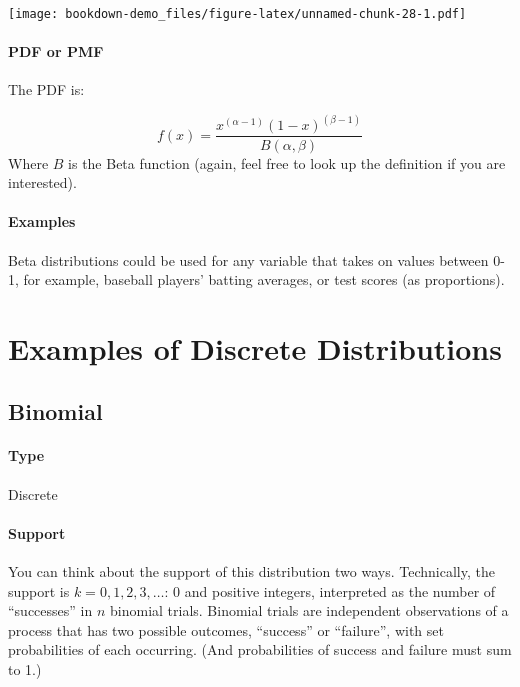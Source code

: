 \documentclass[]{book}
\let\oldparagraph\paragraph
\renewcommand{\paragraph}[1]{\oldparagraph{#1}\mbox{}}
\begin{document}
\texttt{[image: bookdown-demo\_files/figure-latex/unnamed-chunk-28-1.pdf]}

\hypertarget{pdf-or-pmf-2}{%
\paragraph{PDF or PMF}\label{pdf-or-pmf-2}}

The PDF is:

\[ f(x) = \frac{x^{(\alpha -1)}(1-x)^{(\beta-1)}}{ B(\alpha, \beta)}\]
Where \(B\) is the Beta function (again, feel free to look up the definition if you are interested).

\hypertarget{examples-2}{%
\paragraph{Examples}\label{examples-2}}

Beta distributions could be used for any variable that takes on values between 0-1, for example, baseball players' batting averages, or test scores (as proportions).

\hypertarget{examples-of-discrete-distributions}{%
\section{Examples of Discrete Distributions}\label{examples-of-discrete-distributions}}

\hypertarget{binomial}{%
\subsection{Binomial}\label{binomial}}

\hypertarget{type-3}{%
\paragraph{Type}\label{type-3}}

Discrete

\hypertarget{support-3}{%
\paragraph{Support}\label{support-3}}

You can think about the support of this distribution two ways.
Technically, the support is \(k= 0, 1,2,3,\dots\): 0 and positive integers, interpreted as the number of ``successes'' in \(n\) binomial trials. Binomial trials are independent observations of a process that has two possible outcomes, ``success'' or ``failure'', with set probabilities of each occurring. (And probabilities of success and failure must sum to 1.)
\end{document}
